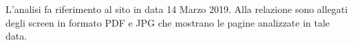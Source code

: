 L'analisi fa riferimento al sito in data 14 Marzo 2019. Alla relazione sono allegati degli screen in formato PDF e JPG che mostrano le pagine analizzate in tale data.